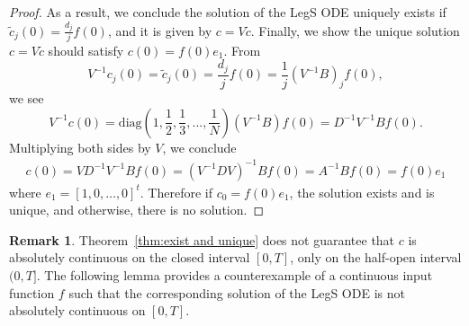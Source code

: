 \documentclass{article}
\theoremstyle{definition}
\newtheorem{remark}{Remark}[section]
\newcommand{\pr}[1]{ \left( #1 \right) }
\begin{document}
\begin{proof}
    As a result, we conclude the solution of the LegS ODE uniquely exists if $\tilde{c}_j(0) = \frac{d_j}{j}f(0)$, and it is given by $c = V \tilde{c}$. 
    Finally, we show the unique solution $c = V \tilde{c}$ should satisfy $c(0) = f(0)e_1$.  
    From %
    \[
        V^{-1}c_j(0) = \tilde{c}_j(0) = \frac{d_j}{j}f(0) = \frac{1}{j}(V^{-1}B)_j f(0),
    \]
    we see
    \[
        V^{-1}c(0)  = \text{diag} \pr{ 1, \frac{1}{2}, \frac{1}{3}, ... , \frac{1}{N} } (V^{-1}B) f(0) = D^{-1} V^{-1} B f(0).
    \]
    Multiplying both sides by $V$, we conclude
    \begin{align*}
        c(0) 
        = V D^{-1} V^{-1} B f(0)
        = ( V^{-1} D V )^{-1}Bf(0)
        = A^{-1}B f(0) 
        = f(0)e_1
    \end{align*}
    where $e_1 = [1, 0, \dots, 0] ^{t}$.  
    Therefore if $c_0 = f(0)e_1$, the solution exists and is unique, and otherwise, there is no solution.
\end{proof}



\begin{remark}    
Theorem~\ref{thm:exist and unique} does not guarantee that $c$ is absolutely continuous on the closed interval $[0,T]$, only on the half-open interval $(0,T]$.
    The following lemma provides a counterexample of a continuous input function $f$ such that the corresponding solution of the LegS ODE is not absolutely continuous on \( [0,T] \).    
\end{remark}
\end{document}
